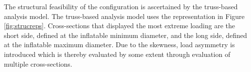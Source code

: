 


The structural feasibility of the configuration is ascertained by the truss-based analysis model. The truss-based analysis model uses the representation in Figure \ref{fig:strucreps}. Cross-sections that displayed the most extreme loading are the short side, defined at the inflatable minimum diameter, and the long side, defined at the inflatable maximum diameter. Due to the skewness, load asymmetry is introduced which is thereby evaluated by some extent through evaluation of multiple cross-sections.

